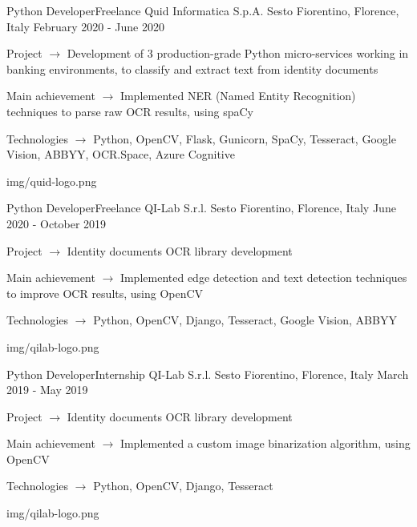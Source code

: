 
\begin{cventries}

  \logocventry
    {Python Developer{\enskip\cdotp\enskip}Freelance}
    {Quid Informatica S.p.A.}
    {Sesto Fiorentino, Florence, Italy}
    {February 2020 - June 2020}
    {
      \begin{cvitems}
        \item {Project $\rightarrow$ Development of 3 production-grade Python micro-services working in banking environments, 
               to classify and extract text from identity documents}
        \item {Main achievement $\rightarrow$ Implemented NER (Named Entity Recognition) techniques to parse raw OCR results, using spaCy}
        \item {Technologies $\rightarrow$ Python, OpenCV, Flask, Gunicorn, SpaCy, Tesseract, Google Vision, ABBYY, OCR.Space, Azure Cognitive}
      \end{cvitems}
    }
    {img/quid-logo.png}

  \logocventry
    {Python Developer{\enskip\cdotp\enskip}Freelance}
    {QI-Lab S.r.l.}
    {Sesto Fiorentino, Florence, Italy}
    {June 2020 - October 2019}
    {
      \begin{cvitems}
        \item {Project $\rightarrow$ Identity documents OCR library development}
        \item {Main achievement $\rightarrow$ Implemented edge detection and text detection techniques to improve OCR results, using OpenCV}
        \item {Technologies $\rightarrow$ Python, OpenCV, Django, Tesseract, Google Vision, ABBYY}
      \end{cvitems}
    }
    {img/qilab-logo.png}
  
  \logocventry
    {Python Developer{\enskip\cdotp\enskip}Internship}
    {QI-Lab S.r.l.}
    {Sesto Fiorentino, Florence, Italy}
    {March 2019 - May 2019}
    {
      \begin{cvitems}
        \item {Project $\rightarrow$ Identity documents OCR library development}
        \item {Main achievement $\rightarrow$ Implemented a custom image binarization algorithm, using OpenCV}
        \item {Technologies $\rightarrow$ Python, OpenCV, Django, Tesseract}
      \end{cvitems}
    }
    {img/qilab-logo.png}


\end{cventries}
